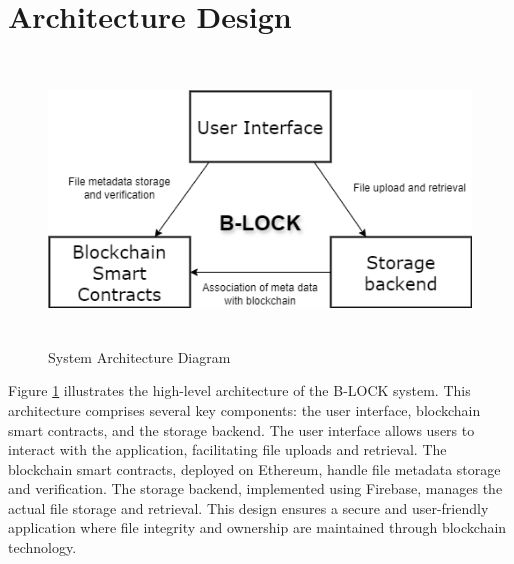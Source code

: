 \documentclass[12pt,a4paper]{report}
\begin{document}
\section{Architecture Design}
\begin{figure}[hbtp]
\centering
\includegraphics[width=5.5in,height=3in]{./pic/architecture.drawio.png}
\caption{System Architecture Diagram}
\label{fig:architecture}
\end{figure}
Figure \ref{fig:architecture} illustrates the high-level architecture of the B-LOCK system. This architecture comprises several key components: the user interface, blockchain smart contracts, and the storage backend. The user interface allows users to interact with the application, facilitating file uploads and retrieval. The blockchain smart contracts, deployed on Ethereum, handle file metadata storage and verification. The storage backend, implemented using Firebase, manages the actual file storage and retrieval. This design ensures a secure and user-friendly application where file integrity and ownership are maintained through blockchain technology.
\end{document}

